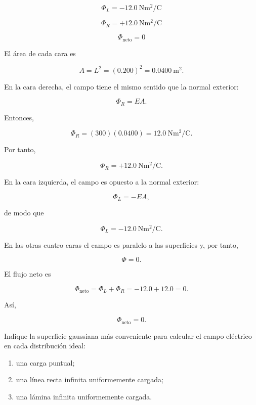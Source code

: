 \begin{respuesta}

\[
\boxed{
\Phi_L=-\SI{12.0}{\newton\metre\squared\per\coulomb}
}
\]

\[
\boxed{
\Phi_R=+\SI{12.0}{\newton\metre\squared\per\coulomb}
}
\]

\[
\boxed{\Phi_{\text{neto}}=0}
\]

\end{respuesta}

\begin{explicacion}

El área de cada cara es

\[
A=L^2=(0.200)^2=\SI{0.0400}{\metre\squared}.
\]

En la cara derecha, el campo tiene el mismo sentido que la normal exterior:

\[
\Phi_R=EA.
\]

Entonces,

\[
\Phi_R=(300)(0.0400)
=\SI{12.0}{\newton\metre\squared\per\coulomb}.
\]

Por tanto,

\[
\boxed{
\Phi_R=+\SI{12.0}{\newton\metre\squared\per\coulomb}
}.
\]

En la cara izquierda, el campo es opuesto a la normal exterior:

\[
\Phi_L=-EA,
\]

de modo que

\[
\boxed{
\Phi_L=-\SI{12.0}{\newton\metre\squared\per\coulomb}
}.
\]

En las otras cuatro caras el campo es paralelo a las superficies y, por tanto,

\[
\Phi=0.
\]

El flujo neto es

\[
\Phi_{\text{neto}}
=\Phi_L+\Phi_R
=-12.0+12.0=0.
\]

Así,

\[
\boxed{\Phi_{\text{neto}}=0}.
\]

\end{explicacion}


\begin{ejercicio}

Indique la superficie gaussiana más conveniente para calcular el campo eléctrico
en cada distribución ideal:

\begin{enumerate}
    \item una carga puntual;
    \item una línea recta infinita uniformemente cargada;
    \item una lámina infinita uniformemente cargada.
\end{enumerate}

\end{ejercicio}


